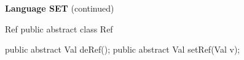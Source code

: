\begin{minipage}[t]{\sw}
\slidenumber
\LARGE
{\bf Language SET} (continued)
\begin{qv}
Ref
public abstract class Ref {

    public abstract Val deRef();
    public abstract Val setRef(Val v);

}
\end{qv}
\end{minipage}
